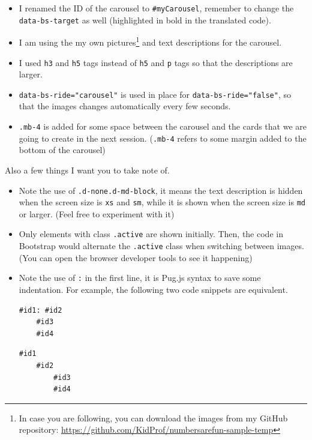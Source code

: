 \begin{itemize}
    \item I renamed the ID of the carousel to \texttt{\#myCarousel}, remember to change the \texttt{data-bs-target} as well (highlighted in bold in the translated code).
    \item I am using the my own pictures\footnote{In case you are following, you can download the images from my GitHub repository: \url{https://github.com/KidProf/numbersarefun-sample-temp}} and text descriptions for the carousel.
    \item I used \texttt{h3} and \texttt{h5} tags instead of \texttt{h5} and \texttt{p} tags so that the descriptions are larger.
    \item \texttt{data-bs-ride="carousel"} is used in place for \texttt{data-bs-ride="false"}, so that the images changes automatically every few seconds.
    \item \texttt{.mb-4} is added for some space between the carousel and the cards that we are going to create in the next session. (\texttt{.mb-4} refers to some margin added to the bottom of the carousel)
\end{itemize}

Also a few things I want you to take note of.

\begin{itemize}
    \item Note the use of \texttt{.d-none.d-md-block}, it means the text description is hidden when the screen size is \texttt{xs} and \texttt{sm}, while it is shown when the screen size is \texttt{md} or larger. (Feel free to experiment with it)
    
    \item Only elements with class \texttt{.active} are shown initially. Then, the code in Bootstrap would alternate the \texttt{.active} class when switching between images. (You can open the browser developer tools to see it happening)

    \item Note the use of \texttt{:} in the first line, it is Pug.js syntax to save some indentation. For example, the following two code snippets are equivalent.

\begin{lstlisting}[language=pug]
#id1: #id2
    #id3
    #id4
\end{lstlisting}

\begin{lstlisting}[language=pug]
#id1
    #id2
        #id3
        #id4
\end{lstlisting}
    
\end{itemize}

